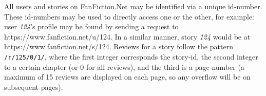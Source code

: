\documentclass[letterpaper]{article}
\begin{document}
All users and stories on FanFiction.Net may be identified via a unique id-number. These id-numbers may be used to directly access one or the other, for example: user \textit{124}'s profile may be found by sending a request to https://www.fanfiction.net/u/124. In a similar manner, story \textit{124} would be at https://www.fanfiction.net/s/124. Reviews for a story follow the pattern \texttt{/r/125/0/1/}, where the first integer corresponds the story-id, the second integer to a certain chapter (or 0 for all reviews), and the third is a page number (a maximum of 15 reviews are displayed on each page, so any overflow will be on subsequent pages).



\end{document}
